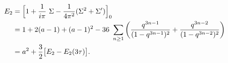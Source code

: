 \begin{equation}
  \begin{split}
    E_2 &= \Big[ 1+{1\over i\pi}~\Sigma -{1\over
    4\pi^2}(\Sigma^2+\Sigma') \Big]_0 \\
  &= 1+2(a-1) +(a-1)^2 -36~\sum_{n\geq 1} \left( {q^{3n-1} \over
    (1-q^{3n-1})^2} + {q^{3n-2} \over (1-q^{3n-2})^2} \right)\\
  &= a^2 +{3\over 2} \big[ E_2 -E_2(3\tau)\big].
  \end{split}
\end{equation}

